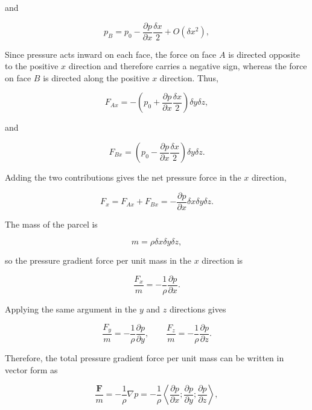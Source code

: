 \documentclass[10pt,twocolumn]{memoir}
\begin{document}
and

\begin{equation}
    p_B = p_0 - \frac{\partial p}{\partial x}\frac{\delta x}{2} + O(\delta x^2),
\end{equation}

Since pressure acts inward on each face, the force on face $A$ is directed opposite to the positive $x$ direction and therefore carries a negative sign, whereas the force on face $B$ is directed along the positive $x$ direction. Thus,

\begin{equation}
    F_{Ax} = -\left(p_0+\frac{\partial p}{\partial x}\frac{\delta x}{2}
    \right)\delta y \delta z,
\end{equation}

and

\begin{equation}
    F_{Bx} = \left(p_0-\frac{\partial p}{\partial x}\frac{\delta x}{2}
    \right)\delta y \delta z.
\end{equation}

Adding the two contributions gives the net pressure force in the $x$ direction,

\begin{equation}
    F_x = F_{Ax}+F_{Bx} = -\frac{\partial p}{\partial x}\delta x \delta y \delta z.
\end{equation}

The mass of the parcel is

\begin{equation}
    m = \rho\delta x \delta y\delta z,
\end{equation}

so the pressure gradient force per unit mass in the $x$ direction is

\begin{equation}
    \frac{F_x}{m} = -\frac{1}{\rho}\frac{\partial p}{\partial x}.
\end{equation}

Applying the same argument in the $y$ and $z$ directions gives

\begin{equation}
    \frac{F_y}{m} = -\frac{1}{\rho}\frac{\partial p}{\partial y},
    \qquad
    \frac{F_z}{m} = -\frac{1}{\rho}\frac{\partial p}{\partial z}.
\end{equation}

Therefore, the total pressure gradient force per unit mass can be written in vector form as

\begin{equation}
    \frac{\mathbf{F}}{m} = -\frac{1}{\rho}\nabla p = -\frac{1}{\rho}\left<\frac{\partial p}{\partial x};\frac{\partial p}{\partial y};\frac{\partial p}{\partial z}\right>,
\end{equation}
\end{document}
